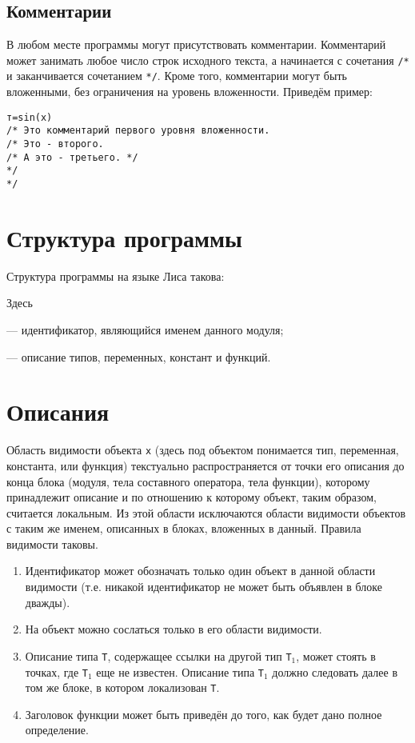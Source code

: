 \documentclass[10pt]{report}
\begin{document}
\section{Комментарии}
В любом месте программы могут присутствовать комментарии.        
Комментарий может занимать любое число строк исходного текста, а начинается с сочетания \verb|/*| и заканчивается сочетанием \verb|*/|. Кроме того, комментарии могут быть вложенными, без ограничения на уровень вложенности.
Приведём пример:
\begin{verbatim}
т=sin(x)
/* Это комментарий первого уровня вложенности.
/* Это - второго.
/* А это - третьего. */
*/
*/
\end{verbatim}

\chapter{Структура программы}
Структура программы на языке Лиса такова:


Здесь

\noindent{} --- идентификатор, являющийся именем данного модуля;

\noindent{} --- описание типов, переменных, констант и функций.


\chapter{Описания}
Область видимости объекта \texttt{x} (здесь под объектом понимается тип, переменная, константа, или функция) текстуально распространяется от точки его описания до
конца блока (модуля, тела составного оператора, тела функции), которому принадлежит описание и по отношению к которому объект, таким образом, считается локальным. Из
этой области исключаются области видимости объектов с таким же именем, описанных в блоках, вложенных в данный. Правила видимости таковы.
\begin{enumerate}
	\item Идентификатор может обозначать только один объект в данной области видимости (т.е. никакой идентификатор не может быть объявлен в блоке дважды).
	\item На объект можно сослаться только в его области видимости.
	\item Описание типа \texttt{T}, содержащее ссылки на другой тип \texttt{T}$_1$, может стоять в точках, где \texttt{T}$_1$ еще не известен. Описание типа \texttt{T}$_1$
	должно следовать далее в том же блоке, в котором локализован \texttt{T}.
	\item Заголовок функции может быть приведён до того, как будет дано полное определение.
\end{enumerate}
\end{document}

